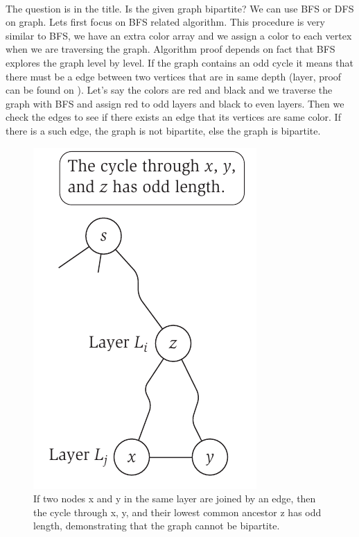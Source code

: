 \documentclass[12pt]{article}
\begin{document}
\paragraph{}The question is in the title. Is the given graph bipartite? We can use BFS or DFS on graph. Lets first focus on BFS related algorithm. This procedure is very similar to BFS, we have an extra color array and we assign a color to each vertex when we are traversing the graph. Algorithm proof depends on fact that BFS explores the graph level by level. If the graph contains an odd cycle it means that there must be a edge between two vertices that are in same depth (layer, proof can be found on \cite{4}). Let's say the colors are red and black and we traverse the graph with BFS and assign red to odd layers and black to even layers. Then we check the edges to see if there exists an edge that its vertices are same color. If there is a such edge, the graph is not bipartite, else the graph is bipartite.
\begin{figure}[h!]
\begin{center}
\includegraphics[scale =.8]{bipartite_check.png}    
  \end{center}
\caption{If two nodes x and
y in the same layer are joined
by an edge, then the cycle
through x, y, and their lowest
common ancestor z has odd
length, demonstrating that
the graph cannot be bipartite.
}
  \label{fig}
\end{figure}
\end{document}
